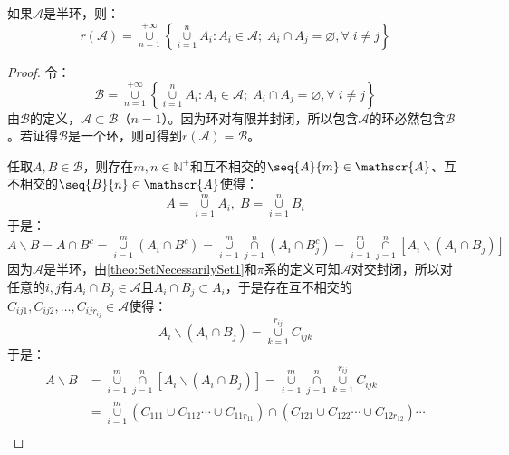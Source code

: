 \begin{theorem}\label{theo:RingGeneratedBySemiring}
	如果$\mathscr{A}$是半环，则：
	\begin{equation*}
		r(\mathscr{A})=
		\underset{n=1}{\overset{+\infty}{\cup}}
		\left\{\underset{i=1}{\overset{n}{\cup}}A_i:A_i\in\mathscr{A};\;A_i\cap A_j=\varnothing,\forall\;i\ne j\right\}
	\end{equation*}
\end{theorem}
\begin{proof}
	令：
	\begin{equation*}
		\mathscr{B}=\underset{n=1}{\overset{+\infty}{\cup}}
		\left\{\underset{i=1}{\overset{n}{\cup}}A_i:A_i\in\mathscr{A};\;A_i\cap A_j=\varnothing,\forall\;i\ne j\right\}
	\end{equation*}
	由$\mathscr{B}$的定义，$\mathscr{A}\subset \mathscr{B}$（$n=1$）。因为环对有限并封闭，所以包含$\mathscr{A}$的环必然包含$\mathscr{B}$。若证得$\mathscr{B}$是一个环，则可得到$r(\mathscr{A})=\mathscr{B}$。\par
	任取$A,B\in \mathscr{B}$，则存在$m,n\in\mathbb{N}^+$和互不相交的$\seq{A}{m}\in \mathscr{A}$、互不相交的$\seq{B}{n}\in \mathscr{A}$使得：
	\begin{equation*}
		A=\underset{i=1}{\overset{m}{\cup}}A_i,\;
		B=\underset{i=1}{\overset{n}{\cup}}B_i
	\end{equation*}
	于是：
	\begin{equation*}
		A\backslash B=A\cap B^c=\underset{i=1}{\overset{m}{\cup}}(A_i\cap B^c)=\underset{i=1}{\overset{m}{\cup}}\underset{j=1}{\overset{n}{\cap}}(A_i\cap B_j^c)=\underset{i=1}{\overset{m}{\cup}}\underset{j=1}{\overset{n}{\cap}}[A_i\backslash(A_i\cap B_j)]
	\end{equation*}
	因为$\mathscr{A}$是半环，由\cref{theo:SetNecessarilySet1}和$\pi$系的定义可知$\mathscr{A}$对交封闭，所以对任意的$i,j$有$A_i\cap B_j\in \mathscr{A}$且$A_i\cap B_j\subset A_i$，于是存在互不相交的$C_{ij1},C_{ij2},\dots,C_{ijr_{ij}}\in \mathscr{A}$使得：
	\begin{equation*}
		A_i\backslash(A_i\cap B_j)=\underset{k=1}{\overset{r_{ij}}{\cup}}C_{ijk}
	\end{equation*}
	于是：
	\begin{align*}
		A\backslash B&=\underset{i=1}{\overset{m}{\cup}}\underset{j=1}{\overset{n}{\cap}}[A_i\backslash(A_i\cap B_j)]=\underset{i=1}{\overset{m}{\cup}}\underset{j=1}{\overset{n}{\cap}}\underset{k=1}{\overset{r_{ij}}{\cup}}C_{ijk} \\
		&=\underset{i=1}{\overset{m}{\cup}}(C_{111}\cup C_{112}\cdots\cup C_{11r_{11}})\cap(C_{121}\cup C_{122}\cdots\cup C_{12r_{12}})\cdots \\

\end{align*}
\end{proof}
